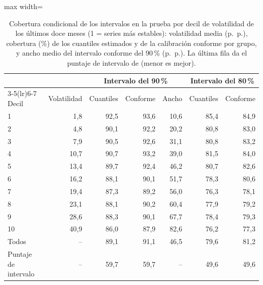 \begin{table}[htbp]\centering\small
\caption{Cobertura condicional de los intervalos en la prueba por decil de volatilidad de los últimos doce meses (1 = series más estables): volatilidad media (p.~p.), cobertura (\%) de los cuantiles estimados y de la calibración conforme por grupo, y ancho medio del intervalo conforme del 90\,\% (p.~p.). La última fila da el puntaje de intervalo de \citet{gneiting2007} (menor es mejor).}\label{tab:cobertura}
\begin{adjustbox}{max width=\textwidth}\begin{tabular}{lrrrrrr}\toprule
& & \multicolumn{3}{c}{Intervalo del 90\,\%} & \multicolumn{2}{c}{Intervalo del 80\,\%}\\ \cmidrule(lr){3-5}\cmidrule(lr){6-7}
Decil & Volatilidad & Cuantiles & Conforme & Ancho & Cuantiles & Conforme\\ \midrule
1 & 1{,}8 & 92{,}5 & 93{,}6 & 10{,}6 & 85{,}4 & 84{,}9 \\
2 & 4{,}8 & 90{,}1 & 92{,}2 & 20{,}2 & 80{,}8 & 83{,}0 \\
3 & 7{,}9 & 90{,}5 & 92{,}6 & 31{,}1 & 80{,}8 & 83{,}2 \\
4 & 10{,}7 & 90{,}7 & 93{,}2 & 39{,}0 & 81{,}5 & 84{,}0 \\
5 & 13{,}4 & 89{,}7 & 92{,}4 & 46{,}2 & 80{,}7 & 82{,}6 \\
6 & 16{,}2 & 88{,}1 & 90{,}1 & 51{,}7 & 78{,}3 & 80{,}6 \\
7 & 19{,}4 & 87{,}3 & 89{,}2 & 56{,}0 & 76{,}3 & 78{,}1 \\
8 & 23{,}1 & 88{,}1 & 90{,}2 & 60{,}4 & 77{,}9 & 79{,}2 \\
9 & 28{,}6 & 88{,}3 & 90{,}1 & 67{,}7 & 78{,}4 & 79{,}3 \\
10 & 40{,}9 & 86{,}0 & 87{,}9 & 82{,}6 & 76{,}2 & 77{,}3 \\
\midrule Todos & -- & 89{,}1 & 91{,}1 & 46{,}5 & 79{,}6 & 81{,}2 \\
Puntaje de intervalo & -- & 59{,}7 & 59{,}7 & -- & 49{,}6 & 49{,}6 \\
\bottomrule\end{tabular}\end{adjustbox}\end{table}
